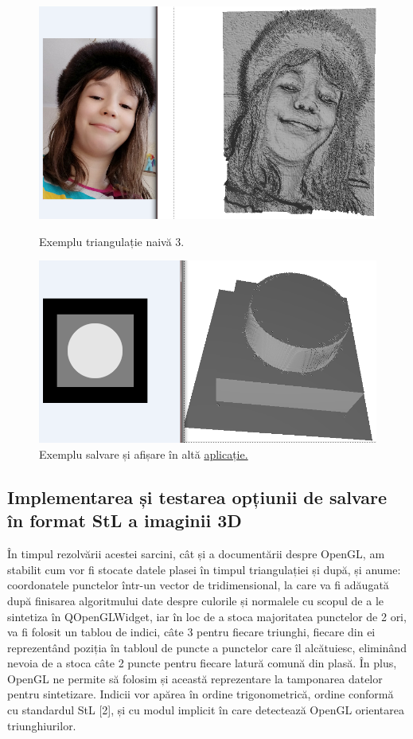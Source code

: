 \documentclass[12pt]{article}
\begin{document}
\begin{figure}[!htb]
	\begin{minipage}{0.48\textwidth}
		\centering
		\includegraphics[width=.7\linewidth]{ExempluNaiva3.png}
		\caption{Exemplu triangulație naivă 3.}\label{fig:fig8}
	\end{minipage}\hfill
	\begin{minipage}{0.48\textwidth}
		\centering
		\includegraphics[width=.7\linewidth]{ExempluSalvare.png}
		\caption{Exemplu salvare și afișare în altă \href{https://www.viewstl.com/}{aplicație.}}\label{fig:fig9}
	\end{minipage}
\end{figure}

\subsection{Implementarea și testarea opțiunii de salvare în format StL a imaginii 3D}

În timpul rezolvării acestei sarcini, cât și a documentării despre OpenGL, am stabilit cum vor fi stocate datele plasei în timpul triangulației și după, și anume: coordonatele punctelor într-un vector de tridimensional, la care va fi adăugată după finisarea algoritmului date despre culorile și normalele cu scopul de a le sintetiza în QOpenGLWidget, iar în loc de a stoca majoritatea punctelor de 2 ori, va fi folosit un tablou de indici, câte 3 pentru fiecare triunghi, fiecare din ei reprezentând poziția în tabloul de puncte a punctelor care îl alcătuiesc, eliminând nevoia de a stoca câte 2 puncte pentru fiecare latură comună din plasă. În plus, OpenGL ne permite să folosim și această reprezentare la tamponarea datelor pentru sintetizare. Indicii vor apărea în ordine trigonometrică, ordine conformă cu standardul StL [2], și cu modul implicit în care detectează OpenGL orientarea triunghiurilor.
\end{document}
